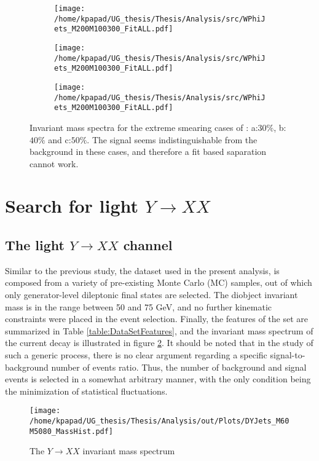 \begin{figure}[hbpt]
\centering
\begin{subfigure}{0.45\textwidth}
\centering
\texttt{[image: /home/kpapad/UG\_thesis/Thesis/Analysis/src/WPhiJets\_M200M100300\_FitALL.pdf]}
\caption{}
\end{subfigure}
\begin{subfigure}{0.45\textwidth}
\centering
\texttt{[image: /home/kpapad/UG\_thesis/Thesis/Analysis/src/WPhiJets\_M200M100300\_FitALL.pdf]}
\caption{}
\end{subfigure}

\begin{subfigure}{0.45\textwidth}
\centering
\texttt{[image: /home/kpapad/UG\_thesis/Thesis/Analysis/src/WPhiJets\_M200M100300\_FitALL.pdf]}
\caption{}
\end{subfigure}
\caption{Invariant mass spectra for the extreme smearing cases of : a:$30\%$, b:$40\%$ and c:$50\%$. The signal seems indistinguishable from the background in these cases, and therefore a fit based saparation cannot work.}
\label{fig:extremeSmearings}
\end{figure}

\newpage
\section{Search for light \(Y \rightarrow XX\)}
\label{sec:org59adc41}
\label{sec:Light_search_Y_to_XX}
\subsection{The light \(Y\rightarrow XX\) channel}
\label{sec:orgabd932d}
\label{Light_y_to_xx}
Similar to the previous study, the dataset used in the present analysis, is composed from a variety of pre-existing Monte Carlo (MC) samples, out of which only generator-level dileptonic final states are selected. The diobject invariant mass is in the range between 50 and 75 GeV, and no further kinematic constraints were placed in the event selection. Finally, the features of the set are summarized in Table \ref{table:DataSetFeatures}, and the invariant mass spectrum of the current decay is illustrated in figure \ref{fig:LightMassSpectrum}. It should be noted that in the study of such a generic process, there is no clear argument regarding a specific signal-to-background number of events ratio. Thus, the number of background and signal events is selected in a somewhat arbitrary manner, with the only condition being the minimization of statistical fluctuations.
\begin{figure}[h]
\centering
\texttt{[image: /home/kpapad/UG\_thesis/Thesis/Analysis/out/Plots/DYJets\_M60M5080\_MassHist.pdf]}
\caption{The $Y\rightarrow XX$ invariant mass spectrum}
\label{fig:LightMassSpectrum}
\end{figure}

